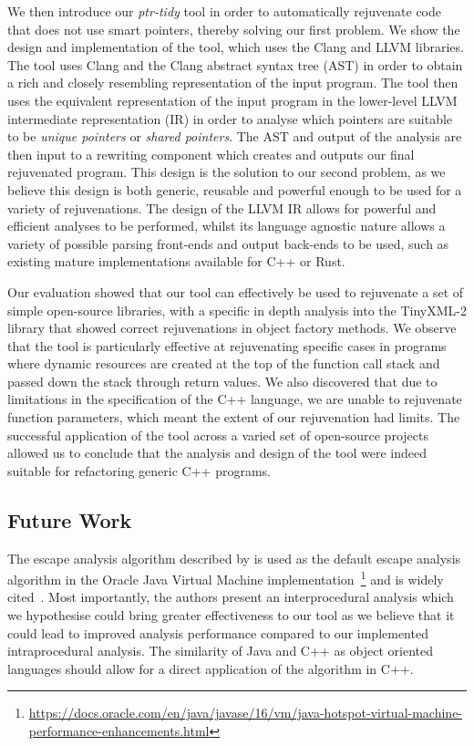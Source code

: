 \documentclass{mpaper}
\begin{document}
    We then introduce our \emph{ptr-tidy} tool in order to automatically rejuvenate code that does not use smart pointers, thereby solving our first problem.
    We show the design and implementation of the tool, which uses the Clang and LLVM libraries. 
    The tool uses Clang and the Clang abstract syntax tree (AST) in order to obtain a rich and closely resembling representation of the input program.
    The tool then uses the equivalent representation of the input program in the lower-level LLVM intermediate representation (IR) in order to analyse which pointers are suitable to be \emph{unique pointers} or \emph{shared pointers}. 
    The AST and output of the analysis are then input to a rewriting component which creates and outputs our final rejuvenated program. 
    This design is the solution to our second problem, as we believe this design is both generic, reusable and powerful enough to be used for a variety of rejuvenations.
    The design of the LLVM IR allows for powerful and efficient analyses to be performed, whilst its language agnostic nature allows a variety of possible parsing front-ends and output back-ends to be used, such as existing mature implementations available for C++ or Rust.
    
    Our evaluation showed that our tool can effectively be used to rejuvenate a set of simple open-source libraries, with a specific in depth analysis into the TinyXML-2 library that showed correct rejuvenations in object factory methods. 
    We observe that the tool is particularly effective at rejuvenating specific cases in programs where dynamic resources are created at the top of the function call stack and passed down the stack through return values. 
    We also discovered that due to limitations in the specification of the C++ language, we are unable to rejuvenate function parameters, which meant the extent of our rejuvenation had limits.
    The successful application of the tool across a varied set of open-source projects allowed us to conclude that the analysis and design of the tool were indeed suitable for refactoring generic C++ programs. 
    
    \subsection{Future Work}
    
    The escape analysis algorithm described by \citet{Choi1999} is used as the default escape analysis algorithm in the Oracle Java Virtual Machine implementation~\footnote{\url{https://docs.oracle.com/en/java/javase/16/vm/java-hotspot-virtual-machine-performance-enhancements.html}} and is widely cited~\cite{Wang2020, Stadler2014}.
    Most importantly, the authors present an interprocedural analysis which we hypothesise could bring greater effectiveness to our tool as we believe that it could lead to improved analysis performance compared to our implemented intraprocedural analysis. 
    The similarity of Java and C++ as object oriented languages should allow for a direct application of the algorithm in C++.
    
\end{document}
